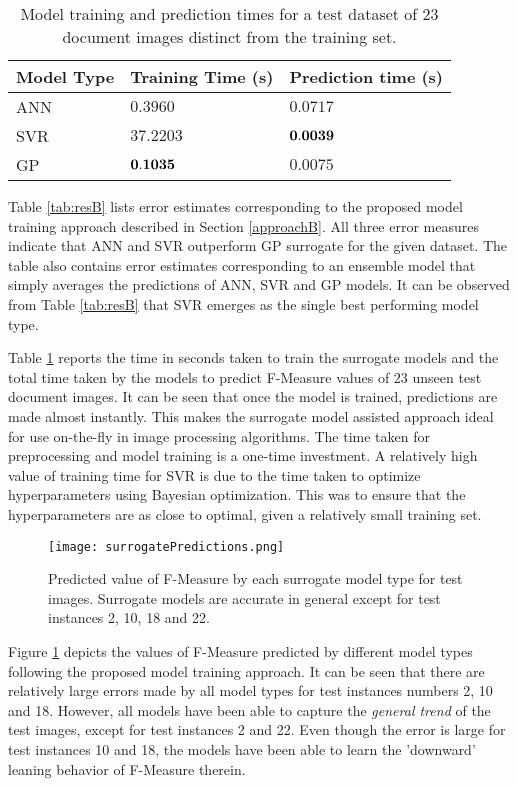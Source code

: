 \documentclass[10pt, a4paper, conference, compsocconf]{IEEEtran}
\begin{document}
\begin{table}[!t]
\centering
\caption{Model training and prediction times for a test dataset of $23$ document images distinct from the training set.\label{tab:times}}
\begin{tabular}{lll}
\hline
Model Type & Training Time (s) & Prediction time (s) \\ \hline
ANN & $0.3960$ & $0.0717$\\
SVR & $37.2203$ & ${\bf 0.0039}$\\
GP & ${\bf 0.1035}$ & $0.0075$\\
\hline
\end{tabular}
\end{table}

Table \ref{tab:resB} lists error estimates corresponding to the proposed model training approach described in Section \ref{approachB}. All three error measures indicate that ANN and SVR outperform GP surrogate for the given dataset. The table also contains error estimates corresponding to an ensemble model that simply averages the predictions of ANN, SVR and GP models. It can be observed from Table \ref{tab:resB} that SVR emerges as the single best performing model type.

Table \ref{tab:times} reports the time in seconds taken to train the surrogate models and the total time taken by the models to predict F-Measure values of $23$ unseen test document images. It can be seen that once the model is trained, predictions are made almost instantly. This makes the surrogate model assisted approach ideal for use on-the-fly in image processing algorithms. The time taken for preprocessing and model training is a one-time investment. A relatively high value of training time for SVR is due to the time taken to optimize hyperparameters using Bayesian optimization. This was to ensure that the hyperparameters are as close to optimal, given a relatively small training set. 


\begin{figure}[!t]
\centering
\texttt{[image: surrogatePredictions.png]}
\caption{Predicted value of F-Measure by each surrogate model type for test images. Surrogate models are accurate in general except for test instances 2, 10, 18 and 22.}
\label{fig_surrPred}
\end{figure}


Figure \ref{fig_surrPred} depicts the values of F-Measure predicted by different model types following the proposed model training approach. It can be seen that there are relatively large errors made by all model types for test instances numbers 2, 10 and 18. However, all models have been able to capture the \emph{general trend} of the test images, except for test instances 2 and 22. Even though the error is large for test instances 10 and 18, the models have been able to learn the 'downward' leaning behavior of F-Measure therein. %
\end{document}
